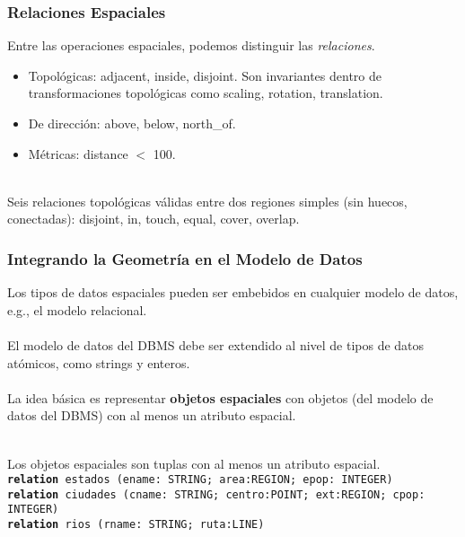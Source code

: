 \documentclass[12pt]{beamer}
\begin{document}
\begin{frame}
\frametitle{Relaciones Espaciales}
Entre las operaciones espaciales, podemos distinguir las \textit{relaciones}.\\
\begin{itemize}
\item Topol\'ogicas: adjacent, inside, disjoint. Son invariantes dentro de transformaciones topol\'ogicas como scaling, rotation, translation.
\item De direcci\'on: above, below, north\_of.
\item M\'etricas: distance $<$ 100.
\end{itemize}
\ \\
Seis relaciones topol\'ogicas v\'alidas entre dos regiones simples (sin huecos, conectadas): disjoint, in, touch, equal, cover, overlap.
\end{frame}

\begin{frame}
\frametitle{Integrando la Geometr\'ia en el Modelo de Datos}
Los tipos de datos espaciales pueden ser embebidos en cualquier modelo de datos, e.g., el modelo relacional.\\
\ \\
El modelo de datos del DBMS debe ser extendido al nivel de tipos de datos at\'omicos, como strings y enteros.\\
\ \\
La idea b\'asica es representar \textbf{objetos espaciales} con objetos (del modelo de datos del DBMS) con al menos un atributo espacial.\\
\ \\
\begin{small}
Los objetos espaciales son tuplas con al menos un atributo espacial.\\
\texttt{\textbf{relation} estados (ename: STRING; area:REGION; epop: INTEGER)}\\
\texttt{\textbf{relation} ciudades (cname: STRING; centro:POINT; ext:REGION; cpop: INTEGER)}\\
\texttt{\textbf{relation} rios (rname: STRING; ruta:LINE)}\\
\end{small}
\end{frame}
\end{document}
